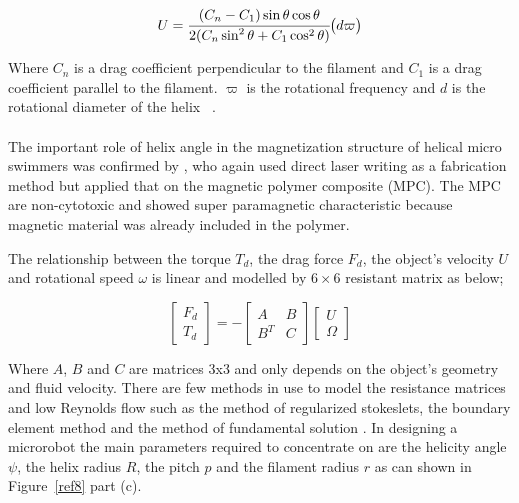 \documentclass[a4paper,11pt]{article}
\begin{document}
\begin{sloppypar}
\begin{equation}
  U = {\cfrac{(C_n - C_1) \sin \theta \cos \theta}{2(C_n \sin^2 \theta + C_1 \cos^2 \theta)}} \big( d \varpi \big)
\end{equation} 

Where $C_n$ is a drag coefficient perpendicular to the filament and $C_1$ is a drag coefficient
 parallel to the filament. $ \varpi$ is the rotational frequency and $d$ is the rotational diameter of 
the helix ~\citep{tottori2012magnetic}.  



\paragraph{}
The important role of helix angle in the magnetization structure of helical micro swimmers 
was confirmed by \citeauthor{peyer2013bacteria}, who again used direct laser writing as a fabrication method but 
applied that on the magnetic polymer composite (MPC). The MPC are non-cytotoxic and showed 
super paramagnetic characteristic because magnetic material was already included in the polymer. 

The relationship between the torque $T_d$, the drag force $F_d$, the object\rq{}s velocity $U$ and rotational 
speed $\omega$ is linear and modelled by $6\times6$ resistant matrix as below;



\[
\begin{bmatrix} F_d \\ 
T_d \end{bmatrix}  =- \begin{bmatrix} A & B \\ 
B^T & C \end{bmatrix}  \begin{bmatrix} U
 \\ \Omega
\end{bmatrix}
\]




Where $A$, $B$ and $C$ are matrices 3x3 and only depends on the object\rq{}s geometry and fluid velocity. 
There are few methods in use to model the resistance matrices and low Reynolds flow such as the 
method of regularized stokeslets, the boundary element method and the method of fundamental solution
. In designing a microrobot the main parameters required to concentrate on are the helicity angle $\psi$, 
the helix radius $R$, the pitch $p$ and the filament radius $r$ as can shown in Figure~\ref{ref8} part (c). 


\end{sloppypar}
\end{document}
